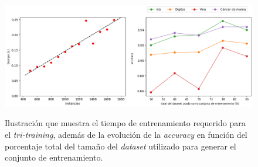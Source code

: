 \begin{figure}[h]
	\caption[\textit{Tri-training}: resultados (tiempo-porcentaje)]{Ilustración que muestra el tiempo de entrenamiento requerido para el \textit{tri-training}, además de la evolución de la \textit{accuracy} en función del porcentaje total del tamaño del \textit{dataset} utilizado para generar el conjunto de entrenamiento.}
	\centering
	\includegraphics[scale=0.4]{../img/memoria/5_tritraining_time-percentage}
	\label{gr:tt_time-percentage}
\end{figure}

